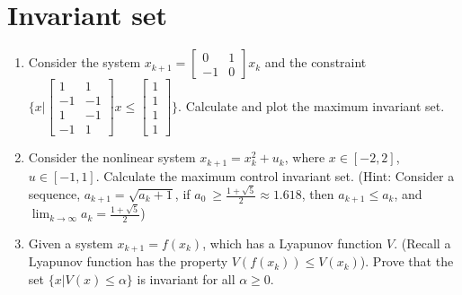 \section{Invariant set}
\begin{enumerate}
    \item Consider the system $x_{k+1} = \begin{bmatrix}
        0&1\\
        -1&0
    \end{bmatrix}x_k$ and the constraint$\{x|\begin{bmatrix}
        1&1\\
        -1&-1\\
        1&-1\\
        -1&1
    \end{bmatrix}x\leq\begin{bmatrix}
        1\\
        1\\
        1\\
        1
    \end{bmatrix}\}$. Calculate and plot the maximum invariant set. \vspace{5\baselineskip}
    \item Consider the nonlinear system $x_{k+1} = x_k^2 + u_k$, where $x\in [-2,2]$, $u\in [-1,1]$. Calculate the maximum control invariant set. (Hint: Consider a sequence, $a_{k+1} = \sqrt{a_k+1}$, if $a_0\ \geq \frac{1+\sqrt{5}}{2}\approx 1.618$, then $a_{k+1}\leq a_k$, and $\lim_{k\rightarrow\infty}a_k = \frac{1+\sqrt{5}}{2}$)\vspace{5\baselineskip}
    \item Given a system $x_{k+1} = f(x_k)$, which has a Lyapunov function $V$. (Recall a Lyapunov function has the property $V(f(x_k))\leq V(x_k)$). Prove that the set $\{x|V(x)\leq \alpha\}$ is invariant for all $\alpha\geq 0$.
\end{enumerate}
